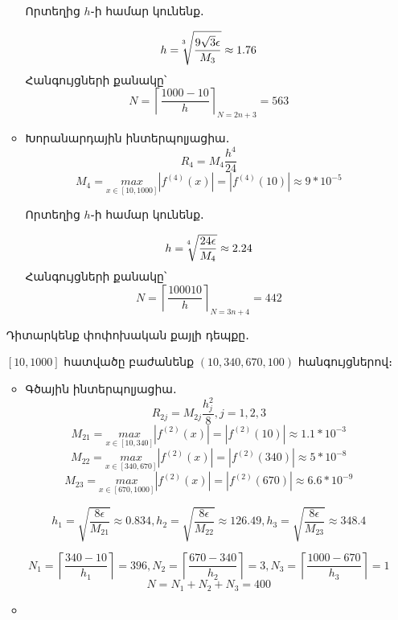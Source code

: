 \documentclass{article}
\begin{document}
\begin{enumerate}
\begin{itemize}
Որտեղից $h$֊ի համար կունենք․

				$$ h = \sqrt[\leftroot{5} \uproot{5} 3]{\dfrac{9 \sqrt{3} \epsilon}{M_{3}}} \approx 1.76$$
				Հանգույցների քանակը՝ $$N = \left \lceil{\dfrac{1000 - 10}{h}} \right \rceil_{N = 2n + 3} = 563$$
\item
Խորանարդային ինտերպոլյացիա․
				$$R_{4} = M_{4} \dfrac{h^{4}}{24}$$
				$$M_{4} = \underset{x \in \left[10, 1000\right]}{max}\left|f^{\left(4\right)}\left(x\right)\right| = \left|f^{\left(4\right)}\left(10\right)\right| \approx 9 * 10^{-5}$$

Որտեղից $h$֊ի համար կունենք․

				$$ h = \sqrt[\leftroot{5} \uproot{5} 4]{\dfrac{24 \epsilon}{M_{4}}} \approx 2.24$$
				Հանգույցների քանակը՝ $$N = \left \lceil{\dfrac{1000   10}{h}} \right \rceil_{N = 3n + 4} = 442$$

\end{itemize}


Դիտարկենք փոփոխական քայլի դեպքը․

$\left[10, 1000\right]$ հատվածը բաժանենք $\left(10, 340, 670, 100\right)$ հանգույցներով։


\begin{itemize}

\item

Գծային ինտերպոլյացիա․
				$$R_{2j} = M_{2j} \dfrac{h_{j}^{2}}{8}, j = 1, 2, 3$$
				$$M_{21} = \underset{x \in \left[10, 340\right]}{max}\left|f^{\left(2\right)}\left(x\right)\right| = \left|f^{\left(2\right)}\left(10\right)\right| \approx 1.1 * 10^{-3}$$
				$$M_{22} = \underset{x \in \left[340, 670\right]}{max}\left|f^{\left(2\right)}\left(x\right)\right| = \left|f^{\left(2\right)}\left(340\right)\right| \approx 5 * 10^{-8}$$
				$$M_{23} = \underset{x \in \left[670, 1000\right]}{max}\left|f^{\left(2\right)}\left(x\right)\right| = \left|f^{\left(2\right)}\left(670\right)\right| \approx 6.6 * 10^{-9}$$


				$$ h_{1} = \sqrt{\dfrac{8 \epsilon}{M_{21}}} \approx 0.834, h_{2} = \sqrt{\dfrac{8 \epsilon}{M_{22}}} \approx 126.49, h_{3} = \sqrt{\dfrac{8 \epsilon}{M_{23}}} \approx 348.4$$

				$$N_{1} = \left \lceil{\dfrac{340 - 10}{h_{1}}} \right \rceil = 396, N_{2} = \left \lceil{\dfrac{670 - 340}{h_{2}}} \right \rceil = 3, N_{3} = \left \lceil{\dfrac{1000 - 670}{h_{3}}} \right \rceil = 1$$
				$$ N = N_{1} + N_{2} + N_{3} = 400$$

\item


\end{itemize}
\end{enumerate}
\end{document}
